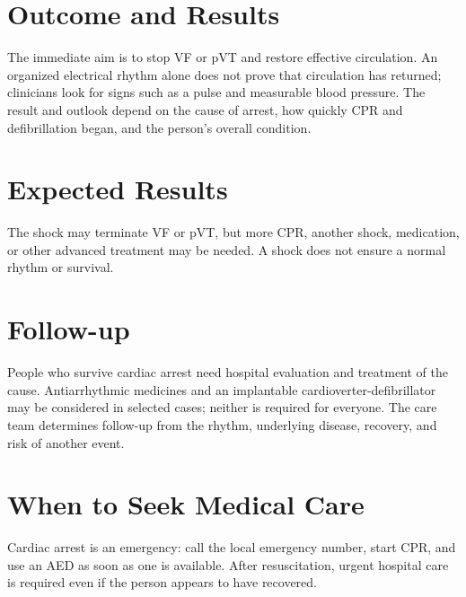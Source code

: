 \section*{Outcome and Results}
The immediate aim is to stop VF or pVT and restore effective circulation. An organized electrical rhythm alone does not prove that circulation has returned; clinicians look for signs such as a pulse and measurable blood pressure. The result and outlook depend on the cause of arrest, how quickly CPR and defibrillation began, and the person's overall condition.

\section*{Expected Results}
The shock may terminate VF or pVT, but more CPR, another shock, medication, or other advanced treatment may be needed. A shock does not ensure a normal rhythm or survival.

\section*{Follow-up}
People who survive cardiac arrest need hospital evaluation and treatment of the cause. Antiarrhythmic medicines and an implantable cardioverter-defibrillator may be considered in selected cases; neither is required for everyone. The care team determines follow-up from the rhythm, underlying disease, recovery, and risk of another event.

\section*{When to Seek Medical Care}
Cardiac arrest is an emergency: call the local emergency number, start CPR, and use an AED as soon as one is available. After resuscitation, urgent hospital care is required even if the person appears to have recovered.

